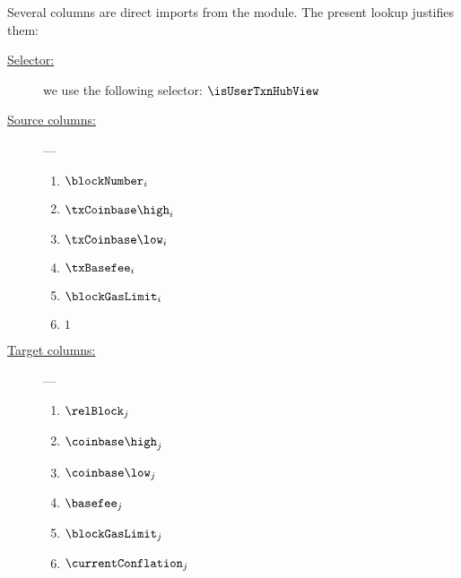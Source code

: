 Several columns are direct imports from the \btcMod{} module.
The present lookup justifies them:
\begin{description}
	\item[\underline{Selector:}]
		we use the following selector: $\isUserTxnHubView$
	\item[\underline{Source columns:}] ---
		\begin{multicols}{2}
			\begin{enumerate}
				\item $\blockNumber     _{i}$
				\item $\txCoinbase\high _{i}$
				\item $\txCoinbase\low  _{i}$
				\item $\txBasefee       _{i}$
				\item $\blockGasLimit   _{i}$
				\item $1$
			\end{enumerate}
		\end{multicols}
	\item[\underline{Target columns:}] ---
		\begin{multicols}{2}
			\begin{enumerate}
				\item $\relBlock          _{j}$
				\item $\coinbase\high     _{j}$
				\item $\coinbase\low      _{j}$
				\item $\basefee           _{j}$
				\item $\blockGasLimit     _{j}$
				\item $\currentConflation _{j}$
			\end{enumerate}
		\end{multicols}
\end{description}
